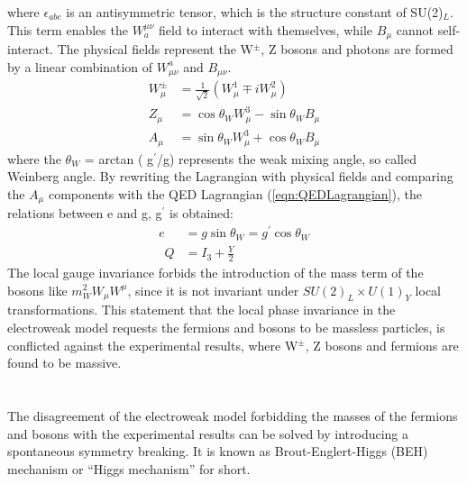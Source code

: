 where $\epsilon_{a b c}$ is an antisymmetric tensor, which is the structure constant of SU(2)$_L$. This term enables the $W_{a}^{\mu \nu}$ field to interact with themselves, while $B_{\mu}$ cannot self-interact.
The physical fields represent the W$^{\pm}$, Z bosons and photons are formed by a linear combination of $W_{\mu \nu}^{a}$ and $B_{\mu \nu}$.
\begin{equation}
\begin{aligned}
W_{\mu}^{\pm} &=\frac{1}{\sqrt{2}}\left(W_{\mu}^{1} \mp i W_{\mu}^{2}\right) \\
Z_{\mu} &=\cos \theta_{W} W_{\mu}^{3}-\sin \theta_{W} B_{\mu} \\
A_{\mu} &=\sin \theta_{W} W_{\mu}^{3}+\cos \theta_{W} B_{\mu}
\end{aligned}
\end{equation}
where the $\theta_{W}$ = arctan ( g$^{\prime}$/g) represents the weak mixing angle, so called Weinberg angle. By rewriting the Lagrangian with physical fields and comparing the $A_{\mu}$ components with the QED Lagrangian (\ref{eqn:QEDLagrangian}), the relations between e and g, g$^{\prime}$ is obtained:
\begin{equation}
\begin{aligned}
e&=g \sin \theta_{W}=g^{\prime} \cos \theta_{W} \\
\ \ Q&=I_{3}+\frac{Y}{2}
\end{aligned}
\end{equation}
The local gauge invariance forbids the introduction of the mass term of the bosons like $m^2_W W_\mu W^\mu$, since it is not invariant under $SU(2)_L \times U(1)_Y$ local transformations.
This statement that the local phase invariance in the electroweak model requests the fermions and bosons to be massless particles, is conflicted against the experimental results, where W$^{\pm}$, Z bosons and fermions are found to be massive.
\\ \\
\noindent\textbf{} \\ 
The disagreement of the electroweak model forbidding the masses of the fermions and bosons with the experimental results can be solved by introducing a spontaneous symmetry breaking.
It is known as Brout-Englert-Higgs (BEH) mechanism or “Higgs mechanism” for short.

